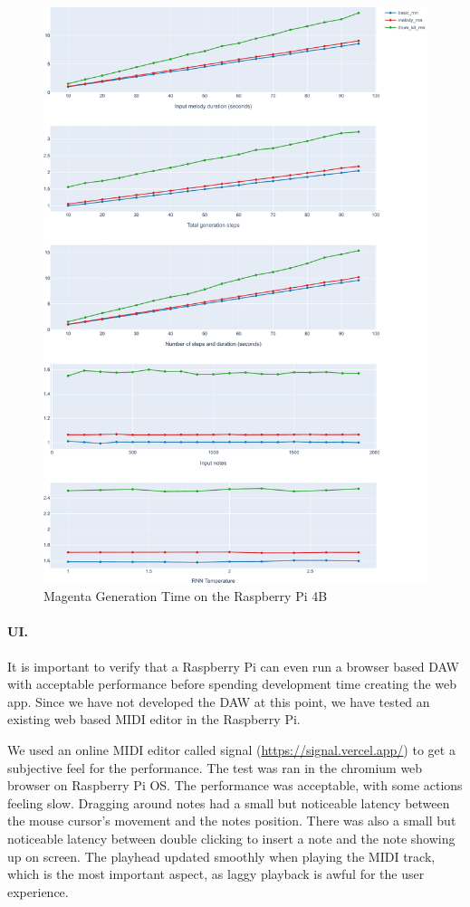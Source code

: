 \begin{figure}
  \centerline{ \includegraphics[width=.95\linewidth]{image/perf.pdf} }
  \caption{Magenta Generation Time on the Raspberry Pi 4B}
  \label{fig:magentaperf}
\end{figure}

\paragraph{UI.} It is important to verify that a Raspberry Pi can even run a browser based
DAW with acceptable performance before spending development time creating the web app.
Since we have not developed the DAW at this point, we have tested an existing web based
MIDI editor in the Raspberry Pi.

We used an online MIDI editor called signal (\url{https://signal.vercel.app/}) to get a
subjective feel for the performance. The test was ran in the chromium web browser on
Raspberry Pi OS. The performance was acceptable, with some actions feeling slow.
Dragging around notes had a small but noticeable latency between the mouse cursor's
movement and the notes position. There was also a small but noticeable latency between
double clicking to insert a note and the note showing up on screen. The playhead updated
smoothly when playing the MIDI track, which is the most important aspect, as laggy
playback is awful for the user experience.

